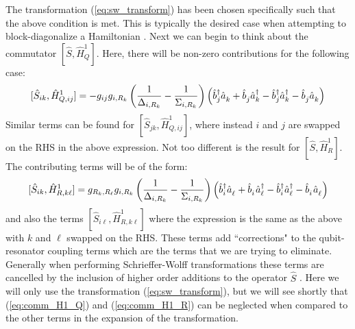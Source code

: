 The transformation (\ref{eq:sw_transform}) has been chosen specifically such that the above condition is met. This is typically the desired case when attempting to block-diagonalize a Hamiltonian \cite{winkler2003, richer_masters}. Next we can begin to think about the commutator $[\hat{S}, \hat{H}^1_Q]$. Here, there will be non-zero contributions for the following case: 
\begin{equation}\label{eq:comm_H1_Q}
    [\hat{S}_{ik}, \hat{H}^1_{Q,ij}] = -g_{ij}g_{i,R_k}\left( \frac{1}{\Delta_{i,R_k}} - \frac{1}{\Sigma_{i,R_k}} \right)\left(\opbd_j\opa_k + \opb_j\opad_k - \opbd_j\opad_k - \opb_j\opa_k \right)
\end{equation}
Similar terms can be found for $[\hat{S}_{jk}, \hat{H}^1_{Q,ij}]$, where instead $i$ and $j$ are swapped on the RHS in the above expression. Not too different is the result for $[\hat{S}, \hat{H}^1_R]$. The contributing terms will be of the form:
\begin{equation}\label{eq:comm_H1_R}
    [\hat{S}_{ik}, \hat{H}^1_{R,k\ell}] = g_{R_k,R_\ell}g_{i,R_k} \left( \frac{1}{\Delta_{i,R_k}} - \frac{1}{\Sigma_{i,R_k}} \right)\left( \opbd_i \opa_\ell + \opb_i\opad_\ell - \opbd_i\opad_\ell - \opb_i\opa_\ell \right)
\end{equation}
and also the terms $[\hat{S}_{i\ell}, \hat{H}^1_{R,k\ell}]$ where the expression is the same as the above with $k$ and $\ell$ swapped on the RHS. These terms add ``corrections" to the qubit-resonator coupling terms which are the terms that we are trying to eliminate. Generally when performing Schrieffer-Wolff transformations these terms are cancelled by the inclusion of higher order additions to the operator $\hat{S}$ \cite{winkler2003,richer_masters}. Here we will only use the transformation (\ref{eq:sw_transform}), but we will see shortly that (\ref{eq:comm_H1_Q}) and (\ref{eq:comm_H1_R}) can be neglected when compared to the other terms in the expansion of the transformation.

